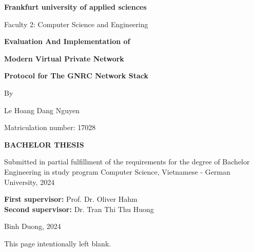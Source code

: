 \documentclass[12pt,twoside]{report}
\begin{document}
\begin{titlepage}
\begin{center}
    \textbf{Frankfurt university of applied sciences}

    \vspace*{0.5cm}

    Faculty 2: Computer Science and Engineering

    \vspace{1cm}

    \textbf{\LARGE 
    Evaluation And Implementation of}
    \vspace{0.3cm}

    \textbf {\LARGE Modern Virtual Private Network }

    \vspace{0.3cm}
    \textbf{\LARGE Protocol for The GNRC Network Stack}

    \vspace{0.8cm}
    \large By
    \vspace{0.2cm}

    \large Le Hoang Dang Nguyen
    \vspace{0.2cm}

    \large Matriculation number: 17028

    \vspace{0.7cm}
    \textbf{\uppercase{Bachelor Thesis}}

    \vspace{0.7cm}
    Submitted in partial fulfillment of the requirements for the degree of 
    Bachelor Engineering in study program Computer Science, Vietnamese - German University, 2024
    \vspace{1cm}

      \textbf{First supervisor:} Prof. Dr. Oliver Hahm \\
      \textbf{Second supervisor:} Dr. Tran Thi Thu Huong

    \vfill

    Binh Duong, 2024

  \end{center}
\end{titlepage}

\newpage  %
\thispagestyle{empty}  %
\hbox{}  %
\vfill  %
\begin{center}
\Large This page intentionally left blank.
\end{center}
\vfill  %

\newpage  %

\thispagestyle{empty}
\end{document}
